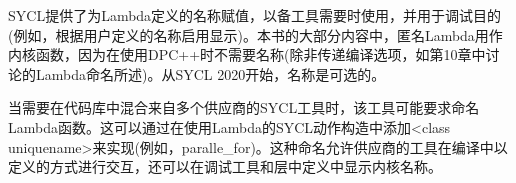 SYCL提供了为Lambda定义的名称赋值，以备工具需要时使用，并用于调试目的(例如，根据用户定义的名称启用显示)。本书的大部分内容中，匿名Lambda用作内核函数，因为在使用DPC++时不需要名称(除非传递编译选项，如第10章中讨论的Lambda命名所述)。从SYCL 2020开始，名称是可选的。\par

当需要在代码库中混合来自多个供应商的SYCL工具时，该工具可能要求命名Lambda函数。这可以通过在使用Lambda的SYCL动作构造中添加<class uniquename>来实现(例如，paralle\_for)。这种命名允许供应商的工具在编译中以定义的方式进行交互，还可以在调试工具和层中定义中显示内核名称。\par